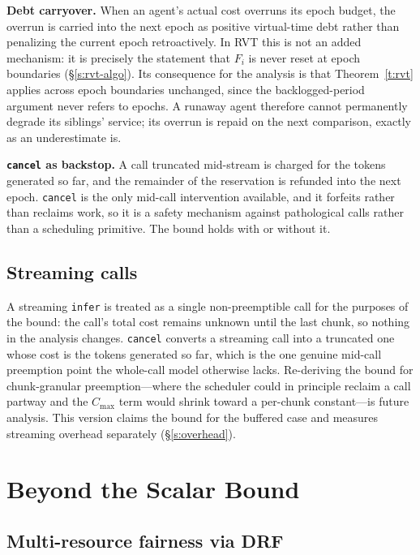 \documentclass[letterpaper,11pt,leqno]{article}
\begin{document}
\textbf{Debt carryover.} When an agent's actual cost overruns its epoch budget, the overrun is carried into the next epoch as positive virtual-time debt rather than penalizing the current epoch retroactively. In RVT this is not an added mechanism: it is precisely the statement that $F_i$ is never reset at epoch boundaries (\S\ref{s:rvt-algo}). Its consequence for the analysis is that Theorem~\ref{t:rvt} applies across epoch boundaries unchanged, since the backlogged-period argument never refers to epochs. A runaway agent therefore cannot permanently degrade its siblings' service; its overrun is repaid on the next comparison, exactly as an underestimate is.

\textbf{\texttt{cancel} as backstop.} A call truncated mid-stream is charged for the tokens generated so far, and the remainder of the reservation is refunded into the next epoch. \texttt{cancel} is the only mid-call intervention available, and it forfeits rather than reclaims work, so it is a safety mechanism against pathological calls rather than a scheduling primitive. The bound holds with or without it.

\subsection{Streaming calls}\label{s:streaming}

A streaming \texttt{infer} is treated as a single non-preemptible call for the purposes of the bound: the call's total cost remains unknown until the last chunk, so nothing in the analysis changes. \texttt{cancel} converts a streaming call into a truncated one whose cost is the tokens generated so far, which is the one genuine mid-call preemption point the whole-call model otherwise lacks. Re-deriving the bound for chunk-granular preemption---where the scheduler could in principle reclaim a call partway and the $C_{\max}$ term would shrink toward a per-chunk constant---is future analysis. This version claims the bound for the buffered case and measures streaming overhead separately (\S\ref{s:overhead}).

\section{Beyond the Scalar Bound}\label{s:beyond}

\subsection{Multi-resource fairness via DRF}\label{s:drf}
\end{document}
